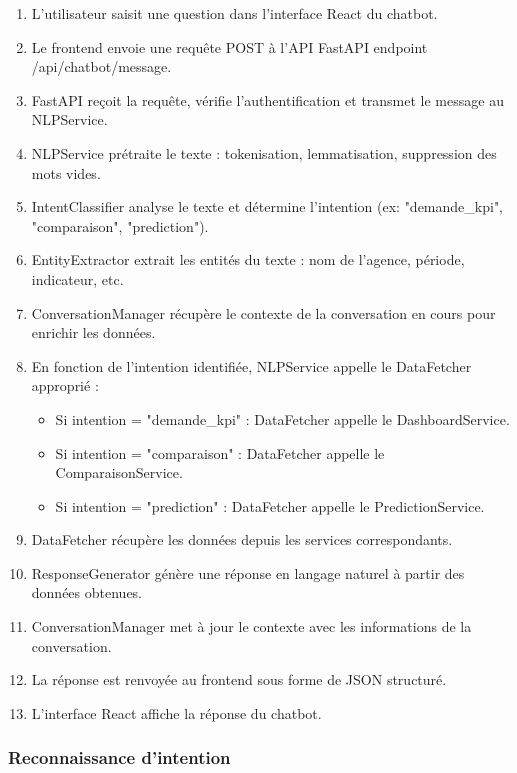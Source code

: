 \begin{enumerate}
    \item L'utilisateur saisit une question dans l'interface React du chatbot.
    \item Le frontend envoie une requête POST à l'API FastAPI endpoint /api/chatbot/message.
    \item FastAPI reçoit la requête, vérifie l'authentification et transmet le message au NLPService.
    \item NLPService prétraite le texte : tokenisation, lemmatisation, suppression des mots vides.
    \item IntentClassifier analyse le texte et détermine l'intention (ex: "demande\_kpi", "comparaison", "prediction").
    \item EntityExtractor extrait les entités du texte : nom de l'agence, période, indicateur, etc.
    \item ConversationManager récupère le contexte de la conversation en cours pour enrichir les données.
    \item En fonction de l'intention identifiée, NLPService appelle le DataFetcher approprié :
        \begin{itemize}
            \item Si intention = "demande\_kpi" : DataFetcher appelle le DashboardService.
            \item Si intention = "comparaison" : DataFetcher appelle le ComparaisonService.
            \item Si intention = "prediction" : DataFetcher appelle le PredictionService.
        \end{itemize}
    \item DataFetcher récupère les données depuis les services correspondants.
    \item ResponseGenerator génère une réponse en langage naturel à partir des données obtenues.
    \item ConversationManager met à jour le contexte avec les informations de la conversation.
    \item La réponse est renvoyée au frontend sous forme de JSON structuré.
    \item L'interface React affiche la réponse du chatbot.
\end{enumerate}

\subsubsection{Reconnaissance d'intention}

